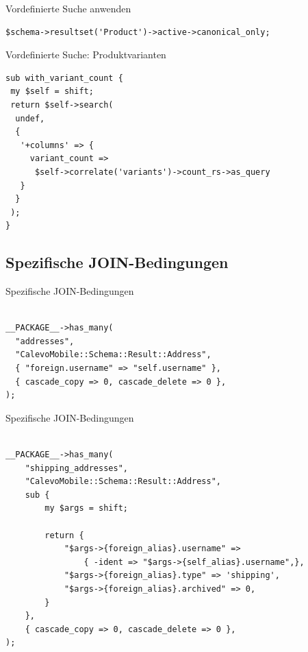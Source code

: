 \begin{frame}[fragile]{Vordefinierte Suche anwenden}
\begin{lstlisting}
$schema->resultset('Product')->active->canonical_only;
\end{lstlisting}
\end{frame}

\begin{frame}[fragile]{Vordefinierte Suche: Produktvarianten}
\begin{lstlisting}
sub with_variant_count {
 my $self = shift;
 return $self->search(
  undef,
  {
   '+columns' => {
     variant_count =>
      $self->correlate('variants')->count_rs->as_query
   }
  }
 );
}
\end{lstlisting}
\end{frame}

\subsection{Spezifische JOIN-Bedingungen}

\begin{frame}[fragile]{Spezifische JOIN-Bedingungen}
\begin{lstlisting}

__PACKAGE__->has_many(
  "addresses",
  "CalevoMobile::Schema::Result::Address",
  { "foreign.username" => "self.username" },
  { cascade_copy => 0, cascade_delete => 0 },
);

\end{lstlisting}
\end{frame}

\begin{frame}[fragile]{Spezifische JOIN-Bedingungen}
\begin{lstlisting}

__PACKAGE__->has_many(
    "shipping_addresses",
    "CalevoMobile::Schema::Result::Address",
    sub {
        my $args = shift;

        return {
            "$args->{foreign_alias}.username" =>
                { -ident => "$args->{self_alias}.username",},
            "$args->{foreign_alias}.type" => 'shipping',
            "$args->{foreign_alias}.archived" => 0,
        }
    },
    { cascade_copy => 0, cascade_delete => 0 },
);
\end{lstlisting}
\end{frame}


